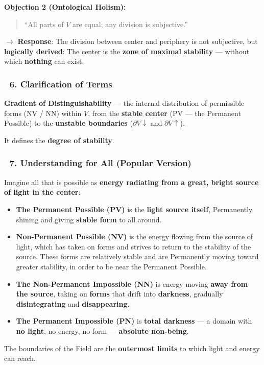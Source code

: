 \documentclass[12pt]{article}
\begin{document}
\bigskip
\textbf{Objection 2 (Ontological Holism):}
\begin{quote}
``All parts of $V$ are equal; any division is subjective.''
\end{quote}
$\rightarrow$ \textbf{Response}:
The division between center and periphery is not subjective, but \textbf{logically derived}:
The center is the \textbf{zone of maximal stability} — without which \textbf{nothing} can exist.

\subsubsection*{🔹 6. Clarification of Terms}
\textbf{Gradient of Distinguishability} — the internal distribution of permissible forms (NV / NN) within $V$, from the \textbf{stable center} (PV — the Permanent Possible) to the \textbf{unstable boundaries} ($\partial V↓$ and $\partial V↑$).

It defines the \textbf{degree of stability}.

\subsubsection*{🔹 7. Understanding for All (Popular Version)}
Imagine all that is possible as \textbf{energy radiating from a great, bright source of light in the center}:

\begin{itemize}
\item \textbf{The Permanent Possible (PV)} is the \textbf{light source itself}, Permanently shining and giving \textbf{stable form} to all around.
\item \textbf{Non-Permanent Possible (NV)} is the energy flowing from the source of light, which has taken on forms and strives to return to the stability of the source. These forms are relatively stable and are Permanently moving toward greater stability, in order to be near the Permanent Possible.
\item \textbf{The Non-Permanent Impossible (NN)} is energy moving \textbf{away from the source}, taking on \textbf{forms} that drift into \textbf{darkness}, gradually \textbf{disintegrating} and \textbf{disappearing}.
\item \textbf{The Permanent Impossible (PN)} is \textbf{total darkness} — a domain with \textbf{no light}, no energy, no form — \textbf{absolute non-being}.
\end{itemize}

The boundaries of the Field are the \textbf{outermost limits} to which light and energy can reach.
\end{document}
